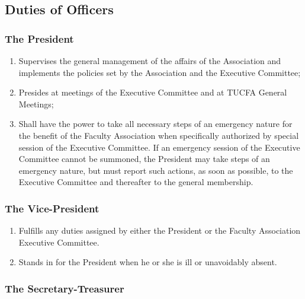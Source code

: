\documentclass[12pt]{article}
\begin{document}
\subsection{Duties of Officers}

\subsubsection{The President}

\begin{enumerate}
\item
Supervises the general management of the affairs of the Association and implements the policies set by the Association and the Executive Committee;
\item
Presides at meetings of the Executive Committee and at TUCFA General Meetings;
\item
Shall have the power to take all necessary steps of an emergency nature for the benefit of the Faculty Association when specifically authorized by special session of the Executive Committee. If an emergency session of the Executive Committee cannot be summoned, the President may take steps of an emergency nature, but must report such actions, as soon as possible, to the Executive Committee and thereafter to the general membership.
\end{enumerate}

\subsubsection{The Vice-President}

\begin{enumerate}
\item
Fulfills any duties assigned by either the President or the Faculty Association Executive Committee.
\item
Stands in for the President when he or she is ill or unavoidably absent.
\end{enumerate}

\subsubsection{The Secretary-Treasurer}
\end{document}
